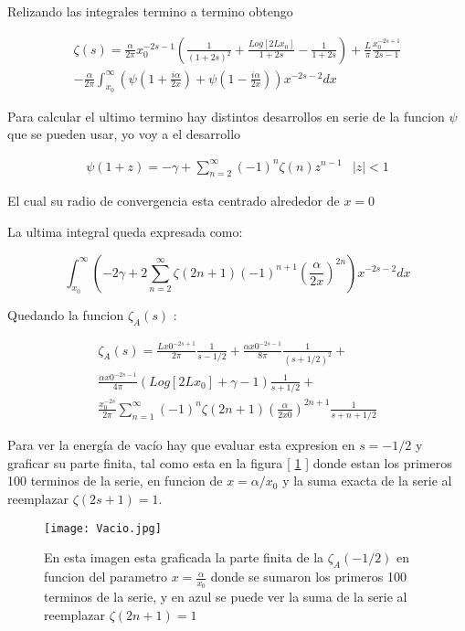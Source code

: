 Relizando las integrales termino a termino obtengo

\begin{equation}
\begin{array}{c}
\zeta (s) = 
\frac{\alpha}{2 \pi} x _{0} ^{-2s-1}
\left( 
\frac{1}{(1+2s) ^2} +
\frac{Log[2 L x _0]}{1+2s} -
\frac{1}{1+2s}
\right) + 
\frac{L}{\pi} \frac{x _0 ^{-2s+1}}{2s-1}  \\
- \frac{\alpha}{2 \pi}
\int _{x_0} ^{\infty} 
\left(
\psi(1 + \frac{i \alpha}{2 x}) +
\psi(1 - \frac{i \alpha}{2 x} )
\right)
x ^{-2s-2}
dx
\end{array}
\end{equation}


Para calcular el ultimo termino hay distintos desarrollos en serie de la funcion $\psi $ que se pueden usar, yo voy a el desarrollo 

\begin{equation}
\begin{array}{cc}
\psi (1+ z ) = - \gamma + \sum _{n=2} ^{\infty} (-1) ^n \zeta (n) z ^{n-1} & |z| < 1
\end{array}
\end{equation}

El cual su radio de convergencia esta centrado alrededor de $x = 0$

La ultima integral queda expresada como:

\begin{equation}
\int _{x_0} ^{\infty}
\left(
-2 \gamma + 
2 \sum _{n=2} ^{\infty}
\zeta (2n+1) (-1) ^{n+1}
( \frac{\alpha}{2 x} ) ^{2n}
\right)
x ^{-2s-2} dx
\end{equation}

Quedando la funcion $\zeta _A (s) $ :

\begin{equation}
\begin{array}{c}
\zeta _A (s) = 
\frac{L x0 ^{-2s+1} }{2 \pi } \frac{1}{s- 1/2} + 
\frac{\alpha x0 ^{-2s-1} }{8 \pi } \frac{1}{(s+1/2) ^2} + \\
\frac{\alpha x0 ^{-2s-1} }{4 \pi } 
\left(
Log[2 L x_0] + \gamma - 1
\right)
\frac{1}{s+1/2} + \\
\frac{x_0 ^{-2s}}{2\pi} 
\sum _{n=1} ^{\infty} (-1) ^{n} \zeta (2n+1) 
( \frac{\alpha}{2 x0} ) ^{2n+1} \frac{1}{s+n+1/2}
\end{array}
\end{equation}

Para ver la energía de vacío hay que evaluar esta expresion en $s=-1/2$ y graficar su parte finita, tal como esta en la figura [ \ref{fig:vacio} ] donde estan los primeros 100 terminos de la serie, en funcion de $x = \alpha / x_0$ y la suma exacta de la serie al reemplazar $\zeta (2s+1) = 1$.

\begin{figure}
    \centering
    \texttt{[image: Vacio.jpg]}
    \caption{En esta imagen esta graficada la parte finita de la $\zeta _A (-1/2) $ en funcion del parametro $x= \frac{\alpha}{x _0}$ donde se sumaron los primeros 100 terminos de la serie, y en azul se puede ver la suma de la serie al reemplazar $\zeta (2n+1) = 1$}
    \label{fig:vacio}
\end{figure}